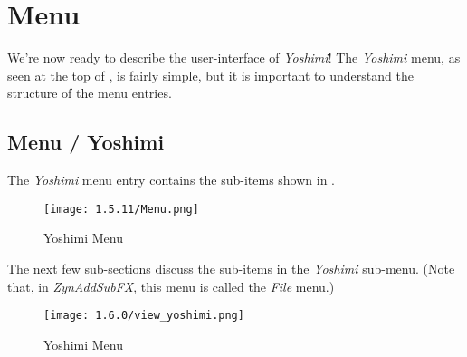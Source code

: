 %
%
%

\section{Menu}
\label{sec:menu}

   We're now ready to describe the user-interface of \textsl{Yoshimi}!
   The \textsl{Yoshimi} menu, as seen at the top of
   ,
   is fairly simple, but it is important to understand the
   structure of the menu entries.

\subsection{Menu / Yoshimi}
\label{subsec:menu_yoshimi}

   The \textsl{Yoshimi}
   menu entry contains the sub-items shown in
   .
   \begin{figure}[H]
   \centering
   \texttt{[image: 1.5.11/Menu.png]}
   \caption[Yoshimi Menu, Exit]{Yoshimi Menu}
   \label{fig:yoshimi_menu_items}
\end{figure}
   The next few sub-sections discuss the sub-items in the
   \textsl{Yoshimi} sub-menu.
   (Note that, in \textsl{ZynAddSubFX}, this menu is called the
   \textsl{File} menu.)


\begin{figure}[H]
   \centering
   \texttt{[image: 1.6.0/view\_yoshimi.png]}
   \caption[Yoshimi Menu, Exit]{Yoshimi Menu}
   \label{fig:yoshimi_view_yoshimi}
\end{figure}

